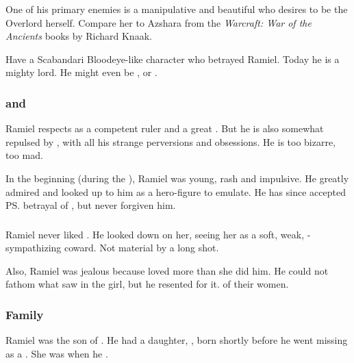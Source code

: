 One of his primary enemies is a manipulative and beautiful \resvil{} who desires to be the \Mystraacht{} Overlord herself. Compare her to Azshara from the \emph{Warcraft: War of the Ancients} books by Richard Knaak. 

Have a Scabandari Bloodeye-like character who betrayed Ramiel. Today he is a mighty \resphan{} lord. 
He might even be \Teshrial, or \Azraid. 





\subsubsection{\Azraid{} and \Damiarch}
Ramiel respects \Azraid{} as a competent ruler and a great \resphan. But he is also somewhat repulsed by \Azraid, with all his strange perversions and obsessions. He is too bizarre, too mad.

In the beginning (during the ), Ramiel was young, rash and impulsive. 
He greatly admired \Damiarch{} and looked up to him as a hero-figure to emulate. 
He has since accepted \ps{\Azraid}{} betrayal of \Damiarch, but never forgiven him. 




\subsubsection{\Eryal}
Ramiel never liked \Eryal. 
He looked down on her, seeing her as a soft, weak, \Merkyrah-sympathizing coward. 
Not \Mystraacht{} material by a long shot. 

Also, Ramiel was jealous because \Shiaraid{} loved \Eryal{} more than she did him. 
He could not fathom what \Shiaraid{} saw in the girl, but he resented \Eryal{} for it. 
 of their women. 





\subsubsection{Family}
Ramiel was the son of . 
He had a daughter, , born shortly before he went missing as a \malach. 
She was  when he . 

